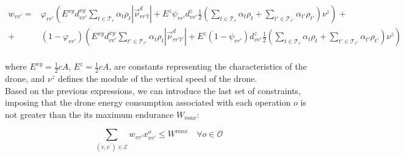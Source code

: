 \documentclass[12pt]{elsarticle}
\begin{document}
\begin{footnotesize}
\begin{align*} \label{eq:consumption_3}\tag{$w-C_3$}   
    w_{vv'}=&
     \varphi_{rr'}\left(E^{xy}d_{vv'}^{xy}\sum_{t\in\mathcal T_r}\alpha_t\rho_t|\vec\nu_{rr't}^{d}|+E^z\psi_{rr'}d_{vv'}^z\frac{1}{2}\left(\sum_{t\in\mathcal T_{r}}\alpha_{t}\rho_{t}+\sum_{t'\in\mathcal T_{r'}}\alpha_{t'}\rho_{t'}\right)\nu^z\right)+\\
    +& (1-\varphi_{rr'})\left(E^{xy}d_{vv'}^{xy}\sum_{t'\in \mathcal T_{r'}}\alpha_t\rho_t|\vec\nu_{rr't'}^{d}|+E^z(1-\psi_{rr'})d_{vv'}^z\frac{1}{2}\left(\sum_{t\in\mathcal T_{r}}\alpha_{t}\rho_{t}+\sum_{t'\in\mathcal T_{r'}}\alpha_{t'}\rho_{t'}\right)\nu^z\right)\\
\end{align*}
\end{footnotesize}




where $E^{xy}=\frac{1}{2}cA$, $E^{z}=\frac{1}{2}cA$, are constants representing the characteristics of the drone, and $\nu^z$ defines the module of the vertical speed of the drone.\\

Based on the previous expressions, we can introduce the last set of constraints, imposing that the drone energy consumption associated with each operation $o$ is not greater than the its maximum endurance $W_{max}$:


\begin{equation*}\label{eq:endurance}\tag{$Endurance$}
\sum_{(v,v^') \in \mathcal E} w_{vv'}x_{vv'}^o \leq W^{max} \quad \forall o \in \mathcal O
\end{equation*}
\end{document}
